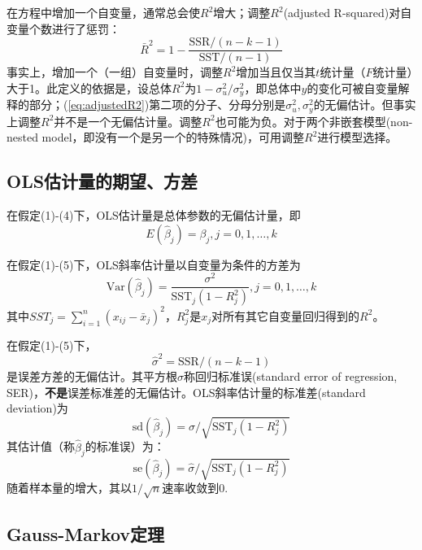 \par 在方程中增加一个自变量，通常总会使$R^2$增大；调整$R^2$(adjusted R-squared)对自变量个数进行了惩罚：
\begin{equation}
    \bar{R}^2=1-\frac{\text{SSR}/(n-k-1)}{\text{SST}/(n-1)}\label{eq:adjustedR2}
\end{equation}
事实上，增加一个（一组）自变量时，调整$R^2$增加当且仅当其$t$统计量（$F$统计量）大于1。此定义的依据是，设总体$R^2$为$1-\sigma_u^2/\sigma_y^2$，即总体中$y$的变化可被自变量解释的部分；(\ref{eq:adjustedR2})第二项的分子、分母分别是$\sigma_u^2,\sigma_y^2$的无偏估计。但事实上调整$R^2$并不是一个无偏估计量。调整$R^2$也可能为负。对于两个非嵌套模型(non-nested model，即没有一个是另一个的特殊情况)，可用调整$R^2$进行模型选择。

\subsection{OLS估计量的期望、方差}

\par 在假定(1)-(4)下，OLS估计量是总体参数的无偏估计量，即
\begin{equation}
    E(\hat{\beta}_j)=\beta_j, j=0,1,\dots,k
\end{equation}
\par 在假定(1)-(5)下，OLS斜率估计量以自变量为条件的方差为
\begin{equation}
    \text{Var}(\hat{\beta}_j)=\frac{\sigma^2}{\text{SST}_j (1-R_j^2)}, j=0,1,\dots,k \label{eq:Variance}
\end{equation}
其中$SST_j=\sum_{i=1}^n (x_{ij}-\bar{x}_j)^2$，$R_j^2$是$x_j$对所有其它自变量回归得到的$R^2$。
\par 在假定(1)-(5)下，
\begin{equation}
    \hat{\sigma}^2=\text{SSR}/(n-k-1)
\end{equation}
是误差方差的无偏估计。其平方根$\hat{\sigma}$称回归标准误(standard error of regression, SER)，\textbf{不是}误差标准差的无偏估计。OLS斜率估计量的标准差(standard deviation)为
\begin{equation}
    \text{sd}(\hat{\beta}_j)=\sigma/\sqrt{\text{SST}_j(1-R_j^2)}
\end{equation}
其估计值（称$\hat{\beta}_j$的标准误）为：
\begin{equation}
    \text{se}(\hat{\beta}_j)=\hat{\sigma}/\sqrt{\text{SST}_j(1-R_j^2)}
\end{equation}
随着样本量的增大，其以$1/\sqrt{n}$速率收敛到0. 

\subsection{Gauss-Markov定理}

